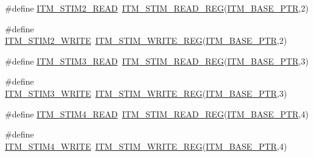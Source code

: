 \begin{DoxyCompactItemize}
\item 
\#define \hyperlink{group___i_t_m___register___accessor___macros_ga34d8d4f75c9b1761c099b65fc7b2073e}{I\+T\+M\+\_\+\+S\+T\+I\+M2\+\_\+\+R\+E\+AD}~\hyperlink{group___i_t_m___register___accessor___macros_ga5009882336aadcd4f37b45cf3395c450}{I\+T\+M\+\_\+\+S\+T\+I\+M\+\_\+\+R\+E\+A\+D\+\_\+\+R\+EG}(\hyperlink{group___i_t_m___peripheral_gafaddee8fe8b6a898d4e5edc43ee0d703}{I\+T\+M\+\_\+\+B\+A\+S\+E\+\_\+\+P\+TR},2)
\item 
\#define \hyperlink{group___i_t_m___register___accessor___macros_gaef5fd73197cf69307c400cd33e9d5c0a}{I\+T\+M\+\_\+\+S\+T\+I\+M2\+\_\+\+W\+R\+I\+TE}~\hyperlink{group___i_t_m___register___accessor___macros_ga049ca92a4e78e77c19af81e51aa73f1c}{I\+T\+M\+\_\+\+S\+T\+I\+M\+\_\+\+W\+R\+I\+T\+E\+\_\+\+R\+EG}(\hyperlink{group___i_t_m___peripheral_gafaddee8fe8b6a898d4e5edc43ee0d703}{I\+T\+M\+\_\+\+B\+A\+S\+E\+\_\+\+P\+TR},2)
\item 
\#define \hyperlink{group___i_t_m___register___accessor___macros_gac2585aa635223db51bc5dfb64d5901f0}{I\+T\+M\+\_\+\+S\+T\+I\+M3\+\_\+\+R\+E\+AD}~\hyperlink{group___i_t_m___register___accessor___macros_ga5009882336aadcd4f37b45cf3395c450}{I\+T\+M\+\_\+\+S\+T\+I\+M\+\_\+\+R\+E\+A\+D\+\_\+\+R\+EG}(\hyperlink{group___i_t_m___peripheral_gafaddee8fe8b6a898d4e5edc43ee0d703}{I\+T\+M\+\_\+\+B\+A\+S\+E\+\_\+\+P\+TR},3)
\item 
\#define \hyperlink{group___i_t_m___register___accessor___macros_ga5dd9fe046bf774394e98b8aae32f09be}{I\+T\+M\+\_\+\+S\+T\+I\+M3\+\_\+\+W\+R\+I\+TE}~\hyperlink{group___i_t_m___register___accessor___macros_ga049ca92a4e78e77c19af81e51aa73f1c}{I\+T\+M\+\_\+\+S\+T\+I\+M\+\_\+\+W\+R\+I\+T\+E\+\_\+\+R\+EG}(\hyperlink{group___i_t_m___peripheral_gafaddee8fe8b6a898d4e5edc43ee0d703}{I\+T\+M\+\_\+\+B\+A\+S\+E\+\_\+\+P\+TR},3)
\item 
\#define \hyperlink{group___i_t_m___register___accessor___macros_ga7bc9ebee3625b9f578807478ac2a35fc}{I\+T\+M\+\_\+\+S\+T\+I\+M4\+\_\+\+R\+E\+AD}~\hyperlink{group___i_t_m___register___accessor___macros_ga5009882336aadcd4f37b45cf3395c450}{I\+T\+M\+\_\+\+S\+T\+I\+M\+\_\+\+R\+E\+A\+D\+\_\+\+R\+EG}(\hyperlink{group___i_t_m___peripheral_gafaddee8fe8b6a898d4e5edc43ee0d703}{I\+T\+M\+\_\+\+B\+A\+S\+E\+\_\+\+P\+TR},4)
\item 
\#define \hyperlink{group___i_t_m___register___accessor___macros_ga15f21956568cb77bc35327f9f4742b0f}{I\+T\+M\+\_\+\+S\+T\+I\+M4\+\_\+\+W\+R\+I\+TE}~\hyperlink{group___i_t_m___register___accessor___macros_ga049ca92a4e78e77c19af81e51aa73f1c}{I\+T\+M\+\_\+\+S\+T\+I\+M\+\_\+\+W\+R\+I\+T\+E\+\_\+\+R\+EG}(\hyperlink{group___i_t_m___peripheral_gafaddee8fe8b6a898d4e5edc43ee0d703}{I\+T\+M\+\_\+\+B\+A\+S\+E\+\_\+\+P\+TR},4)

\end{DoxyCompactItemize}
